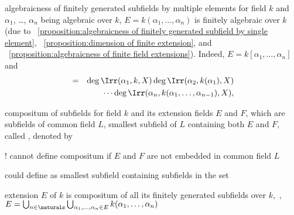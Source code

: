 \documentclass[17pt,landscape]{foils}
\begin{document}
{\vfill
\begin{myproposition}{algebraicness of finitely generated subfields by multiple elements}%
	for field $k$
	and
	$\alpha_1$, \ldots, $\alpha_n$ being algebraic over $k$,
	$E=k(\alpha_1,\ldots,\alpha_n)$
	is finitely algebraic over $k$
	(due to \propositionname~\ref{proposition:algebraicness of finitely generated subfield by single element},
	\propositionname~\ref{proposition:dimension of finite extension},
	and
	\propositionname~\ref{proposition:algebraicness of finite field extensions}).
	Indeed, $E = k[\alpha_1, \ldots, \alpha_n]$ and
	\begin{eqnarray*}
			[k(\alpha_1,\ldots,\alpha_n):k] &=& \deg \Irr(\alpha_1,k,X) \deg \Irr(\alpha_2,k(\alpha_1),X)
		\\
		&&
			\cdots \deg \Irr(\alpha_n, k(\alpha_1,\ldots,\alpha_{n-1}), X),
	\end{eqnarray*}
\end{myproposition}



\begin{mydefinition}{compositum of subfields}%
	for field $k$ and its extension fields $E$ and $F$, which are subfields of common field $L$,
	smallest subfield of $L$ containing both $E$ and $F$,
	called ,
	denoted by 
	\shrinkspacewithintheoremslike\
	\ibit
	\item [!]
		cannot define compositum if $E$ and $F$ are not embedded in common field $L$
	\eit
\end{mydefinition}

\bit
\item
	could define 
	as smallest subfield containing subfields in the set
\eit

\vfill
\begin{mylemma}{}
	extension $E$ of $k$ is
	compositum of all its finitely generated subfields over $k$,\
	\ie,
	$
		E =
			\bigcup_{n\in\naturals}
			\bigcup_{\alpha_1, \ldots, \alpha_n \in E}
			k(\alpha_1,\ldots,\alpha_n)
	$
\end{mylemma}
\vfill


}
\end{document}
